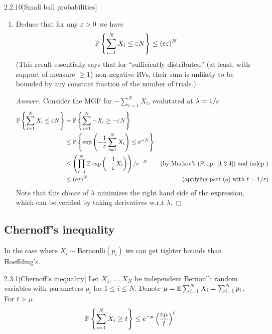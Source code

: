{\begin{ex}{2.2.10}[Small ball probabilities]
\begin{enumerate}[label=(\alph*)]
\item Deduce that for any $\varepsilon > 0$ we have
\begin{align*}
    \mathbb{P} \left\{\sum_{i=1}^N X_i \leq \varepsilon N\right\} \leq (e\varepsilon)^N
\end{align*}
(This result essentially says that for ``sufficiently distributed'' (at least, with support of measure $\geq 1$) non-negative RVs, their sum is unlikely to be bounded by any constant fraction of the number of trials.)
\begin{proof}[Answer]
Consider the MGF for $-\sum_{i=1}^N X_i$, evalutated at $\lambda = 1/\varepsilon$
\begin{align*}
    \mathbb{P} \left\{\sum_{i=1}^N X_i \leq \varepsilon N\right\} &= \mathbb{P} \left\{\sum_{i=1}^N -X_i \geq -\varepsilon N\right\} \\
    &\leq \mathbb{P} \left\{\exp\left(-\frac 1 {\varepsilon}\sum_{i=1}^N X_i\right) \leq e^ {- N }\right\} \\
    &\leq\left(\prod_{i=1}^N \mathbb{E} \exp\left(-\frac1{\varepsilon} X_i\right)\right) /e^{-N} &\text{(by Markov's (Prop. \ref{1.2.4}) and indep.)} \\
    &\leq (e\varepsilon)^N &\text{(applying part (a) with $t=1/\varepsilon$)}
\end{align*}
Note that this choice of $\lambda$ minimizes the right hand side of the expression, which can be verified by taking derivatives w.r.t $\lambda$.
\end{proof}
\end{enumerate}
\end{ex}


\subsection{Chernoff's inequality} %

In the case where $X_i \sim \text{Bernoulli}(p_i)$ we can get tighter bounds than Hoeffding's.

\begin{thm}{2.3.1}[Chernoff's inequality]\label{2.3.1}
Let $X_1,...,X_N$ be independent Bernoulli random variables with parameters $p_i$ for $1 \leq i \leq N$. Denote $\mu = \mathbb{E}\sum_{i=1}^N X_i = \sum_{i=1}^N p_i$. For $t>\mu$
\begin{align*}
    \mathbb{P} \left\{\sum_{i=1}^N X_i \geq t \right\} \leq e^{-\mu}\left(\frac {e \mu} {t}\right)^t
\end{align*}
\end{thm}

}
